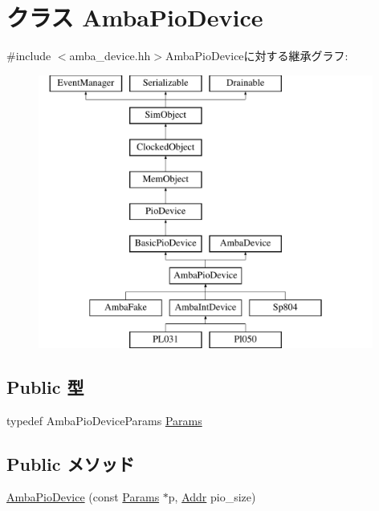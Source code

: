 \hypertarget{classAmbaPioDevice}{
\section{クラス AmbaPioDevice}
\label{classAmbaPioDevice}
}


{\ttfamily \#include $<$amba\_\-device.hh$>$}AmbaPioDeviceに対する継承グラフ:\begin{figure}[H]
\begin{center}
\leavevmode
\includegraphics[height=9cm]{classAmbaPioDevice}
\end{center}
\end{figure}
\subsection*{Public 型}
\begin{DoxyCompactItemize}
\item 
typedef AmbaPioDeviceParams \hyperlink{classAmbaPioDevice_ab091a3a8ffa1f3152ec35e30d1b384d5}{Params}
\end{DoxyCompactItemize}
\subsection*{Public メソッド}
\begin{DoxyCompactItemize}
\item 
\hyperlink{classAmbaPioDevice_a4d233593026e483123ea04aaa7fe8daf}{AmbaPioDevice} (const \hyperlink{classAmbaPioDevice_ab091a3a8ffa1f3152ec35e30d1b384d5}{Params} $\ast$p, \hyperlink{base_2types_8hh_af1bb03d6a4ee096394a6749f0a169232}{Addr} pio\_\-size)
\end{DoxyCompactItemize}
